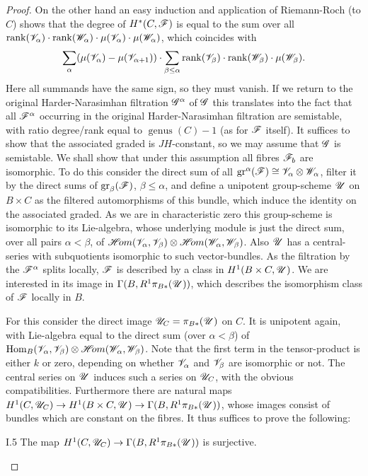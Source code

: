\documentclass[12pt,english]{smfart}
\newcommand{\shHom}{\mathscr{H}\!om} \newcommand{\shEnd}{\mathscr{E}\!nd} \newcommand{\shAut}{\mathfrak{A}ut} \newcommand{\End}{\mathscr{E}\!nd} \newcommand{\Isom}{\mathscr{I}\!som} \newcommand{\Char}{\mathscr{C}\!har} \newcommand{\Conn}{\mathscr{C}\!onn} \newcommand{\Diff}{\mathscr{D}\!iff} \newcommand{\Bor}{\mathscr{B}or} \newcommand{\Flag}{\mathscr{F}\!lag} \renewcommand{\Im}{\mathscr{I}\!m}
\DeclareMathOperator{\Hom}{Hom} \DeclareMathOperator{\Ext}{Ext} \DeclareMathOperator{\Der}{Der} \DeclareMathOperator{\rank}{rank} \DeclareMathOperator{\rk}{rk} \DeclareMathOperator{\Spec}{Spec} \DeclareMathOperator{\depth}{depth} \DeclareMathOperator{\genus}{genus} \DeclareMathOperator{\Lie}{Lie} \DeclareMathOperator{\Ad}{Ad} \DeclareMathOperator{\ad}{ad} \DeclareMathOperator{\id}{id} \DeclareMathOperator{\tr}{tr} \DeclareMathOperator{\ch}{ch} \DeclareMathOperator{\Td}{Td} \DeclareMathOperator{\gr}{gr} \DeclareMathOperator{\Pic}{Pic} \DeclareMathOperator{\Aut}{Aut} \DeclareMathOperator{\Out}{Out} \DeclareMathOperator{\Gal}{Gal} \DeclareMathOperator{\PGL}{PGL} \DeclareMathOperator{\GL}{GL} \DeclareMathOperator{\SL}{SL} \DeclareMathOperator{\Ima}{Im} \newcommand{\HDR}{H_{\mathrm{DR}}} \newcommand{\Mpar}{\sM^{0}_{\theta}(\sG)_{\mathrm{par}}}
\theoremstyle{plain} \newtheorem{innerthm}{Theorem} \newtheorem{innerlem}{Lemma} \newtheorem{innerprop}{Proposition} \newtheorem{innercor}{Corollary} \theoremstyle{definition} \newtheorem{innerdefn}{Definition} \newtheorem{innerconstr}{Construction} \theoremstyle{remark} \newtheorem*{remark}{Remark} \newtheorem*{remarks}{Remarks} \newtheorem*{applications}{Applications}
\begin{document}
\begin{proof}
On the other hand an easy induction and application of Riemann-Roch (to $C$) shows that the degree of $H^*(C,\mathscr{F})$ is equal to the sum over all $\rank(\sV_\alpha)\cdot\rank(\sW_\alpha)\cdot\mu(\sV_\alpha)\cdot\mu(\sW_\alpha)$, which coincides with
\[
\sum_\alpha(\mu(\sV_\alpha)-\mu(\sV_{\alpha+1}))\cdot
\sum_{\beta\le\alpha}\rank(\sV_\beta)\cdot\rank(\sW_\beta)\cdot\mu(\sW_\beta).
\]
Here all summands have the same sign, so they must vanish. If we return to the original Harder-Narasimhan filtration $\mathscr{G}^\alpha$ of $\mathscr{G}$ this translates into the fact that all $\mathscr{F}^\alpha$ occurring in the original Harder-Narasimhan filtration are semistable, with ratio degree/rank equal to $\genus(C)-1$ (as for $\mathscr{F}$ itself). It suffices to show that the associated graded is $JH$-constant, so we may assume that $\mathscr{G}$ is semistable. We shall show that
under this assumption all fibres $\mathscr{F}_b$ are isomorphic. To do this consider the direct sum of all $\gr^\alpha(\sF)\cong\sV_\alpha\otimes\sW_\alpha$, filter it by the direct sums of $\gr_\beta(\sF)$, $\beta\le\alpha$, and define a unipotent group-scheme $\mathscr{U}$ on $B\times C$ as the filtered automorphisms of this bundle, which induce the identity on the associated graded. As we are in characteristic zero this group-scheme is isomorphic to its Lie-algebra, whose underlying module is just the direct sum, over all pairs $\alpha<\beta$, of $\shHom(\sV_\alpha,\sV_\beta)\otimes\shHom(\sW_\alpha,\sW_\beta)$. Also $\mathscr{U}$ has a central-series with subquotients isomorphic to such vector-bundles. As the filtration by the $\mathscr{F}^\alpha$ splits locally, $\mathscr{F}$ is described by a class in $H^1(B\times C,\mathscr{U})$. We are interested in its image in $\Gamma(B,R^1\pi_{B*}(\mathscr{U}))$, which describes the isomorphism class of $\mathscr{F}$ locally in $B$.

For this consider the direct image $\mathscr{U}_C=\pi_{B*}(\mathscr{U})$ on $C$. It is unipotent again, with Lie-algebra equal to the direct sum (over $\alpha<\beta$) of $\Hom_B(\sV_\alpha,\sV_\beta)\otimes\shHom(\sW_\alpha,\sW_\beta)$. Note that the first term in the tensor-product is either $k$ or zero, depending on whether $\mathscr{V}_\alpha$ and $\mathscr{V}_\beta$ are isomorphic or not. The central series on $\mathscr{U}$ induces such a series on $\mathscr{U}_C$, with the obvious compatibilities. Furthermore there are natural maps $H^1(C,\mathscr{U}_C)\to H^1(B\times C,\mathscr{U})\to\Gamma(B,R^1\pi_{B*}(\mathscr{U}))$, whose images consist of bundles which are constant on the fibres. It thus suffices to prove the following:

\begin{lemma}{I.5}\label{lem:I.5}
The map $H^1(C,\mathscr{U}_C)\to\Gamma(B,R^1\pi_{B*}(\mathscr{U}))$ is surjective.
\end{lemma}


\end{proof}
\end{document}
